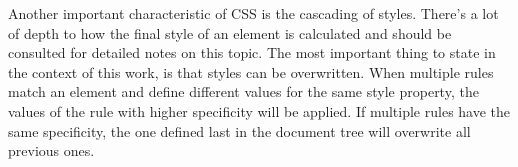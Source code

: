 



Another important characteristic of CSS is the cascading of
styles. There's a lot of depth to how the final style of an element is
calculated and \cite{CSS21} should be consulted for detailed notes on
this topic. The most important thing to state in the context of this
work, is that styles can be overwritten. When multiple rules match an
element and define different values for the same style property, the
values of the rule with higher specificity will be applied. If
multiple rules have the same specificity, the one defined last in the
document tree will overwrite all previous ones.




